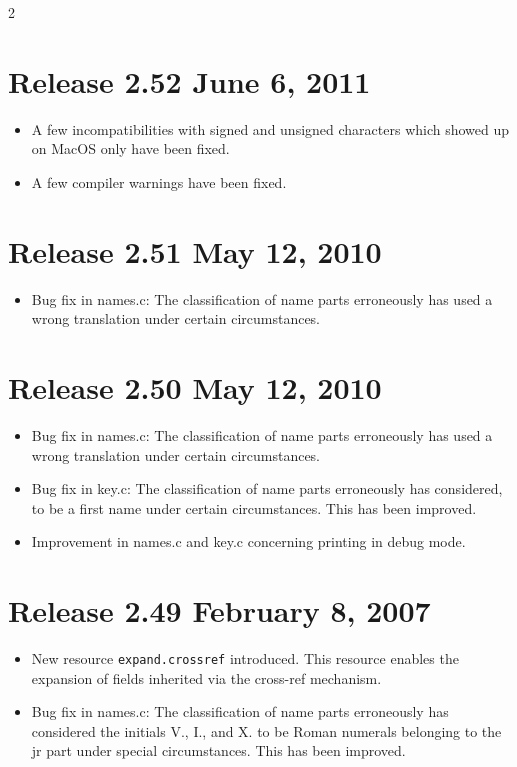 \documentclass[11pt,a4paper]{scrartcl}
\newcommand\rsc[1]{\texttt{#1}}
\newcommand\File[1]{\textsf{#1}}
\newenvironment{Releases}{\begin{multicols}2\RaggedRight}{\end{multicols}}
\newenvironment{Release}[2]{%
  \def\tmp{#2}%
  \section*{Release #1 \ifx\tmp\empty\else{\normalsize[#2]}\fi}
  \begin{itemize}
}{\end{itemize}}
\newenvironment{Fix}[1]{\item }{}
\newenvironment{New}[1]{\item }{}
\begin{document}
\begin{Releases}
 \begin{Release}{2.52}{June 6, 2011}
  \begin{Fix}{gene}
    A few incompatibilities with signed and unsigned characters which
    showed up on MacOS only have been fixed.
  \end{Fix}
  \begin{Fix}{gene}
    A few compiler warnings have been fixed.
  \end{Fix}
 \end{Release}

 \begin{Release}{2.51}{May 12, 2010}
  \begin{Fix}{gene}
    Bug fix in \File{names.c}: The classification of name parts
    erroneously has used a wrong translation under certain circumstances.
  \end{Fix}
 \end{Release}

 \begin{Release}{2.50}{May 12, 2010}
  \begin{Fix}{gene}
    Bug fix in \File{names.c}: The classification of name parts
    erroneously has used a wrong translation under certain
    circumstances.
  \end{Fix}
  \begin{Fix}{gene}
    Bug fix in \File{key.c}: The classification of name parts
    erroneously has considered, to be a first name under certain
    circumstances. This has been improved.
  \end{Fix}
  \begin{Fix}{gene}
    Improvement in \File{names.c} and \File{key.c} concerning printing in
    debug mode.
  \end{Fix}
 \end{Release}

 \begin{Release}{2.49}{February 8, 2007}
  \begin{New}{gene}
    New resource \rsc{expand.crossref} introduced. This resource
    enables the expansion of fields inherited via the cross-ref
    mechanism.
  \end{New}
  \begin{Fix}{gene}
    Bug fix in \File{names.c}: The classification of name parts
    erroneously has considered the initials V., I., and X. to be Roman
    numerals belonging to the jr part under special circumstances.
    This has been improved.
  \end{Fix}


\end{Release}
\end{Releases}
\end{document}
